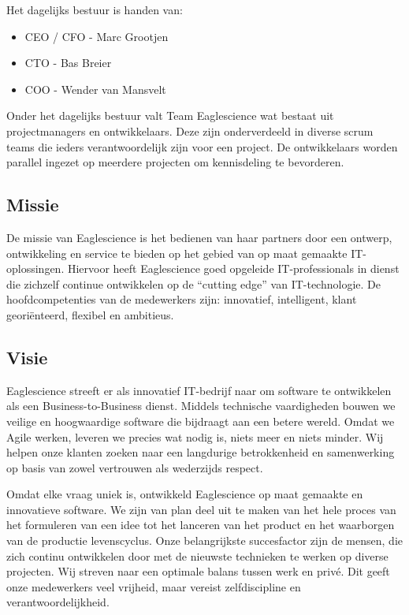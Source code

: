 Het dagelijks bestuur is handen van:
\begin{itemize}
\item CEO / CFO - Marc Grootjen
\item CTO - Bas Breier
\item COO - Wender van Mansvelt
\end{itemize}
Onder het dagelijks bestuur valt Team Eaglescience wat bestaat uit projectmanagers en ontwikkelaars. Deze zijn onderverdeeld in diverse scrum teams die ieders verantwoordelijk zijn voor een project. De ontwikkelaars worden parallel ingezet op meerdere projecten om kennisdeling te bevorderen.

\subsection{Missie}\label{subsec:missie}

De missie van Eaglescience is het bedienen van haar partners door een ontwerp, ontwikkeling en service te bieden op het gebied van op maat gemaakte IT-oplossingen. Hiervoor heeft Eaglescience goed opgeleide IT-professionals in dienst die zichzelf continue ontwikkelen op de “cutting edge” van IT-technologie. De hoofdcompetenties van de medewerkers zijn: innovatief, intelligent, klant georiënteerd, flexibel en ambitieus.

\subsection{Visie}\label{subsec:visie}
Eaglescience streeft er als innovatief IT-bedrijf naar om software te ontwikkelen als een Business-to-Business dienst. Middels technische vaardigheden bouwen we veilige en hoogwaardige software die bijdraagt aan een betere wereld. Omdat we Agile werken, leveren we precies wat nodig is, niets meer en niets minder. Wij helpen onze klanten zoeken naar een langdurige betrokkenheid en samenwerking op basis van zowel vertrouwen als wederzijds respect.

Omdat elke vraag uniek is, ontwikkeld Eaglescience op maat gemaakte en innovatieve software.  We zijn van plan deel uit te maken van het hele proces van het formuleren van een idee tot het lanceren van het product en het waarborgen van de productie levenscyclus. Onze belangrijkste succesfactor zijn de mensen, die zich continu ontwikkelen door met de nieuwste technieken te werken op diverse projecten. Wij streven naar een optimale balans tussen werk en privé. Dit geeft onze medewerkers veel vrijheid, maar vereist zelfdiscipline en verantwoordelijkheid.


